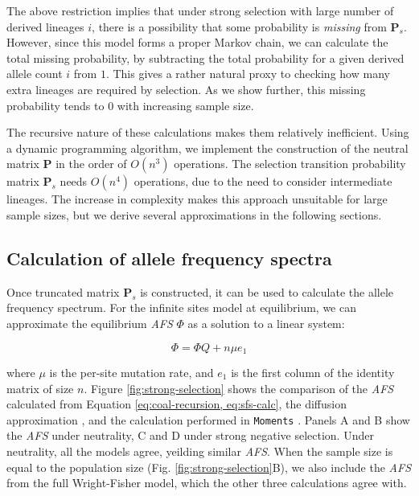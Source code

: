 \documentclass[review]{elsarticle}
\begin{document}
The above restriction implies that under strong selection with large number of derived lineages $i$,
there is a possibility that some probability is \textit{missing} from $\mathbf{P}_s$. However, since
this model forms a proper Markov chain, we can calculate the total missing probability, by
subtracting the total probability for a given derived allele count $i$ from $1$. This gives a rather
natural proxy to checking how many extra lineages are required by selection. As we show further,
this missing probability tends to $0$ with increasing sample size.

The recursive nature of these calculations makes them relatively inefficient. Using a dynamic
programming algorithm, we implement the construction of the neutral matrix $\mathbf{P}$ in the order
of $O(n^3)$ operations. The selection transition probability matrix $\mathbf{P}_s$ needs $O(n^4)$
operations, due to the need to consider intermediate lineages. The increase in complexity makes this
approach unsuitable for large sample sizes, but we derive several approximations in the following
sections.

\subsection{Calculation of allele frequency spectra}
\label{subsec:afs}

Once truncated matrix $\mathbf{P}_s$ is constructed, it can be used to calculate the allele
frequency spectrum. For the infinite sites model at equilibrium, we can approximate the equilibrium
\textit{AFS} $\Phi$ as a solution to a linear system:

\begin{equation}
  \label{eq:sfs-calc}
  \Phi = \Phi Q + n \mu e_1
\end{equation}

where $\mu$ is the per-site mutation rate, and $e_1$ is the first column of the identity matrix of
size $n$. Figure \ref{fig:strong-selection} shows the comparison of the \textit{AFS} calculated from
Equation \eqref{eq:coal-recursion, eq:sfs-calc}, the diffusion approximation \cite[eq.
9.23]{Ewens2004}, and the calculation performed in \texttt{Moments} \citep{JouganousEtAl2017}.
Panels A and B show the \textit{AFS} under neutrality, C and D under strong negative selection.
Under neutrality, all the models agree, yeilding similar \textit{AFS}. When the sample size is equal
to the population size (Fig. \ref{fig:strong-selection}B), we also include the \textit{AFS} from the
full Wright-Fisher model, which the other three calculations agree with.
\end{document}
